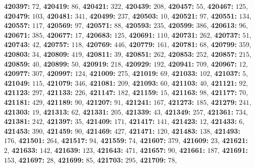 \textsf{\bfseries 420397:} $72$, \textsf{\bfseries 420419:} $86$, \textsf{\bfseries 420421:} $322$, \textsf{\bfseries 420439:} $208$, \textsf{\bfseries 420457:} $55$, \textsf{\bfseries 420467:} $125$, \textsf{\bfseries 420479:} $103$, \textsf{\bfseries 420481:} $341$, \textsf{\bfseries 420499:} $237$, \textsf{\bfseries 420503:} $10$, \textsf{\bfseries 420521:} $97$, \textsf{\bfseries 420551:} $134$, \textsf{\bfseries 420557:} $117$, \textsf{\bfseries 420569:} $97$, \textsf{\bfseries 420571:} $88$, \textsf{\bfseries 420593:} $235$, \textsf{\bfseries 420599:} $386$, \textsf{\bfseries 420613:} $96$, \textsf{\bfseries 420671:} $385$, \textsf{\bfseries 420677:} $17$, \textsf{\bfseries 420683:} $125$, \textsf{\bfseries 420691:} $110$, \textsf{\bfseries 420731:} $262$, \textsf{\bfseries 420737:} $51$, \textsf{\bfseries 420743:} $42$, \textsf{\bfseries 420757:} $118$, \textsf{\bfseries 420769:} $446$, \textsf{\bfseries 420779:} $161$, \textsf{\bfseries 420781:} $68$, \textsf{\bfseries 420799:} $359$, \textsf{\bfseries 420803:} $34$, \textsf{\bfseries 420809:} $419$, \textsf{\bfseries 420811:} $39$, \textsf{\bfseries 420851:} $262$, \textsf{\bfseries 420853:} $252$, \textsf{\bfseries 420857:} $215$, \textsf{\bfseries 420859:} $40$, \textsf{\bfseries 420899:} $50$, \textsf{\bfseries 420919:} $218$, \textsf{\bfseries 420929:} $192$, \textsf{\bfseries 420941:} $709$, \textsf{\bfseries 420967:} $12$, \textsf{\bfseries 420977:} $307$, \textsf{\bfseries 420997:} $124$, \textsf{\bfseries 421009:} $275$, \textsf{\bfseries 421019:} $69$, \textsf{\bfseries 421033:} $102$, \textsf{\bfseries 421037:} $5$, \textsf{\bfseries 421049:} $115$, \textsf{\bfseries 421079:} $346$, \textsf{\bfseries 421081:} $209$, \textsf{\bfseries 421093:} $60$, \textsf{\bfseries 421103:} $40$, \textsf{\bfseries 421121:} $92$, \textsf{\bfseries 421123:} $297$, \textsf{\bfseries 421133:} $226$, \textsf{\bfseries 421147:} $182$, \textsf{\bfseries 421159:} $15$, \textsf{\bfseries 421163:} $98$, \textsf{\bfseries 421177:} $70$, \textsf{\bfseries 421181:} $429$, \textsf{\bfseries 421189:} $90$, \textsf{\bfseries 421207:} $91$, \textsf{\bfseries 421241:} $167$, \textsf{\bfseries 421273:} $185$, \textsf{\bfseries 421279:} $241$, \textsf{\bfseries 421303:} $19$, \textsf{\bfseries 421313:} $62$, \textsf{\bfseries 421331:} $205$, \textsf{\bfseries 421339:} $43$, \textsf{\bfseries 421349:} $257$, \textsf{\bfseries 421361:} $734$, \textsf{\bfseries 421381:} $242$, \textsf{\bfseries 421397:} $35$, \textsf{\bfseries 421409:} $171$, \textsf{\bfseries 421417:} $141$, \textsf{\bfseries 421423:} $12$, \textsf{\bfseries 421433:} $6$, \textsf{\bfseries 421453:} $390$, \textsf{\bfseries 421459:} $90$, \textsf{\bfseries 421469:} $427$, \textsf{\bfseries 421471:} $120$, \textsf{\bfseries 421483:} $138$, \textsf{\bfseries 421493:} $176$, \textsf{\bfseries 421501:} $264$, \textsf{\bfseries 421517:} $94$, \textsf{\bfseries 421559:} $74$, \textsf{\bfseries 421607:} $379$, \textsf{\bfseries 421609:} $23$, \textsf{\bfseries 421621:} $2$, \textsf{\bfseries 421633:} $142$, \textsf{\bfseries 421639:} $123$, \textsf{\bfseries 421643:} $471$, \textsf{\bfseries 421657:} $90$, \textsf{\bfseries 421661:} $187$, \textsf{\bfseries 421691:} $153$, \textsf{\bfseries 421697:} $28$, \textsf{\bfseries 421699:} $85$, \textsf{\bfseries 421703:} $295$, \textsf{\bfseries 421709:} $78$, 
